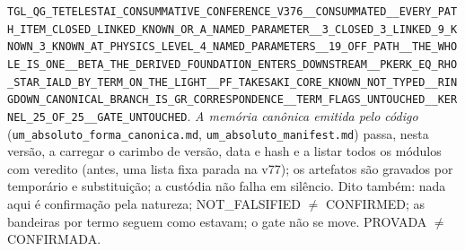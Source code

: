 \documentclass[11pt]{article}
\theoremstyle{definition}\newtheorem{deriv}{Derivação}
\begin{document}
\texttt{TGL\_QG\_TETELESTAI\_CONSUMMATIVE\_CONFERENCE\_V376\_\_CONSUMMATED\_\_EVERY\_PATH\_ITEM\_CLOSED\_LINKED\_KNOWN\_OR\_A\_NAMED\_PARAMETER\_\_3\_CLOSED\_3\_LINKED\_9\_KNOWN\_3\_KNOWN\_AT\_PHYSICS\_LEVEL\_4\_NAMED\_PARAMETERS\_\_19\_OFF\_PATH\_\_THE\_WHOLE\_IS\_ONE\_\_BETA\_THE\_DERIVED\_FOUNDATION\_ENTERS\_DOWNSTREAM\_\_PKERK\_EQ\_RHO\_STAR\_IALD\_BY\_TERM\_ON\_THE\_LIGHT\_\_PF\_TAKESAKI\_CORE\_KNOWN\_NOT\_TYPED\_\_RINGDOWN\_CANONICAL\_BRANCH\_IS\_GR\_CORRESPONDENCE\_\_TERM\_FLAGS\_UNTOUCHED\_\_KERNEL\_25\_OF\_25\_\_GATE\_UNTOUCHED}. \emph{A memória canônica emitida pelo código} (\texttt{um\_absoluto\_forma\_canonica.md}, \texttt{um\_absoluto\_manifest.md}) passa, nesta versão, a carregar o carimbo de versão, data e hash e a listar todos os módulos com veredito (antes, uma lista fixa parada na v77); os artefatos são gravados por temporário e substituição; a custódia não falha em silêncio. Dito também: nada aqui é confirmação pela natureza; NOT\_FALSIFIED $\neq$ CONFIRMED; as bandeiras por termo seguem como estavam; o gate não se move. PROVADA $\neq$ CONFIRMADA.
\end{document}
